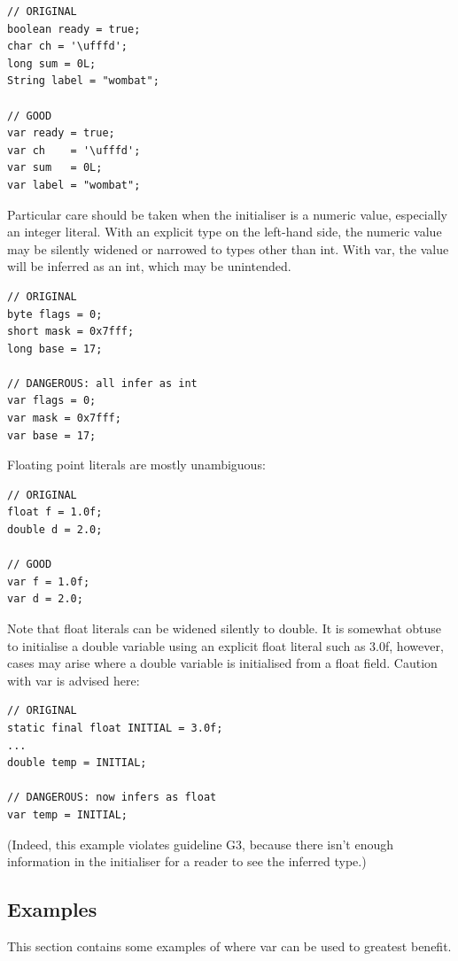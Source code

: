 \documentclass[11pt,a4paper, titlepage, parskip=half, headsepline, footsepline, cleardoublepage=current, headheight=1cm]{scrbook}
\begin{document}
\begin{enumerate}
{\begin{lstlisting}
// ORIGINAL
boolean ready = true;
char ch = '\ufffd';
long sum = 0L;
String label = "wombat";

// GOOD
var ready = true;
var ch    = '\ufffd';
var sum   = 0L;
var label = "wombat";
\end{lstlisting}

Particular care should be taken when the initialiser is a numeric value, especially an integer literal. With an explicit type on the left-hand side, the numeric value may be silently widened or narrowed to types other than int. With var, the value will be inferred as an int, which may be unintended.

\begin{lstlisting}
// ORIGINAL
byte flags = 0;
short mask = 0x7fff;
long base = 17;

// DANGEROUS: all infer as int
var flags = 0;
var mask = 0x7fff;
var base = 17;
\end{lstlisting}

Floating point literals are mostly unambiguous:

\begin{lstlisting}
// ORIGINAL
float f = 1.0f;
double d = 2.0;

// GOOD
var f = 1.0f;
var d = 2.0;
\end{lstlisting}

Note that float literals can be widened silently to double. It is somewhat obtuse to initialise a double variable using an explicit float literal such as 3.0f, however, cases may arise where a double variable is initialised from a float field. Caution with var is advised here:

\begin{lstlisting}
// ORIGINAL
static final float INITIAL = 3.0f;
...
double temp = INITIAL;

// DANGEROUS: now infers as float
var temp = INITIAL;
\end{lstlisting}

(Indeed, this example violates guideline G3, because there isn’t enough information in the initialiser for a reader to see the inferred type.)}
\end{enumerate}

\subsection{Examples}
This section contains some examples of where var can be used to greatest benefit.
\end{document}
